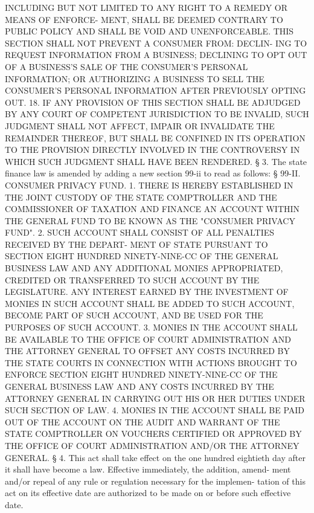  INCLUDING  BUT NOT LIMITED TO ANY RIGHT TO A REMEDY OR MEANS OF ENFORCE-
 MENT, SHALL BE DEEMED CONTRARY TO PUBLIC POLICY AND SHALL  BE  VOID  AND
 UNENFORCEABLE.  THIS SECTION SHALL NOT PREVENT A CONSUMER FROM:  DECLIN-
 ING  TO  REQUEST  INFORMATION FROM A BUSINESS; DECLINING TO OPT OUT OF A
 BUSINESS'S SALE OF THE CONSUMER'S PERSONAL INFORMATION; OR AUTHORIZING A
 BUSINESS TO SELL THE CONSUMER'S PERSONAL  INFORMATION  AFTER  PREVIOUSLY
 OPTING OUT.
   18. IF ANY PROVISION OF THIS SECTION SHALL BE ADJUDGED BY ANY COURT OF
 COMPETENT  JURISDICTION  TO  BE INVALID, SUCH JUDGMENT SHALL NOT AFFECT,
 IMPAIR OR INVALIDATE THE REMAINDER THEREOF, BUT SHALL BE CONFINED IN ITS
 OPERATION TO THE PROVISION DIRECTLY INVOLVED IN THE CONTROVERSY IN WHICH
 SUCH JUDGMENT SHALL HAVE BEEN RENDERED.
   § 3. The state finance law is amended by adding a new section 99-ii to
 read as follows:
   § 99-II. CONSUMER PRIVACY FUND. 1. THERE IS HEREBY ESTABLISHED IN  THE
 JOINT  CUSTODY OF THE STATE COMPTROLLER AND THE COMMISSIONER OF TAXATION
 AND FINANCE AN ACCOUNT WITHIN THE  GENERAL  FUND  TO  BE  KNOWN  AS  THE
 "CONSUMER PRIVACY FUND".
   2. SUCH ACCOUNT SHALL CONSIST OF ALL PENALTIES RECEIVED BY THE DEPART-
 MENT  OF  STATE  PURSUANT TO SECTION EIGHT HUNDRED NINETY-NINE-CC OF THE
 GENERAL BUSINESS LAW AND ANY ADDITIONAL MONIES APPROPRIATED, CREDITED OR
 TRANSFERRED TO SUCH ACCOUNT BY THE LEGISLATURE. ANY INTEREST  EARNED  BY
 THE INVESTMENT OF MONIES IN SUCH ACCOUNT SHALL BE ADDED TO SUCH ACCOUNT,
 BECOME  PART  OF  SUCH  ACCOUNT,  AND  BE  USED FOR THE PURPOSES OF SUCH
 ACCOUNT.
   3. MONIES IN THE ACCOUNT SHALL BE AVAILABLE TO  THE  OFFICE  OF  COURT
 ADMINISTRATION  AND THE ATTORNEY GENERAL TO OFFSET ANY COSTS INCURRED BY
 THE STATE COURTS IN CONNECTION WITH ACTIONS BROUGHT TO  ENFORCE  SECTION
 EIGHT  HUNDRED  NINETY-NINE-CC OF THE GENERAL BUSINESS LAW AND ANY COSTS
 INCURRED BY THE ATTORNEY GENERAL IN CARRYING OUT HIS OR HER DUTIES UNDER
 SUCH SECTION OF LAW.
   4. MONIES IN THE ACCOUNT SHALL BE PAID OUT OF THE ACCOUNT ON THE AUDIT
 AND WARRANT OF THE STATE COMPTROLLER ON VOUCHERS CERTIFIED  OR  APPROVED
 BY THE OFFICE OF COURT ADMINISTRATION AND/OR THE ATTORNEY GENERAL.
   § 4. This act shall take effect on the one hundred eightieth day after
 it  shall have become a law. Effective immediately, the addition, amend-
 ment and/or repeal of any rule or regulation necessary for the implemen-
 tation of this act on its effective date are authorized to be made on or
 before such effective date.

